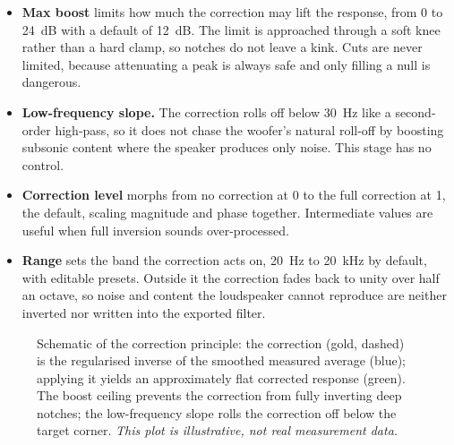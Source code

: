 \begin{itemize}[nosep]
  \item \textbf{Max boost} limits how much the correction may lift the response, from 0 to \SI{24}{\dB} with a default of \SI{12}{\dB}. The limit is approached through a soft knee rather than a hard clamp, so notches do not leave a kink. Cuts are never limited, because attenuating a peak is always safe and only filling a null is dangerous.
  \item \textbf{Low-frequency slope.} The correction rolls off below \SI{30}{\hertz} like a second-order high-pass, so it does not chase the woofer's natural roll-off by boosting subsonic content where the speaker produces only noise. This stage has no control.
  \item \textbf{Correction level} morphs from no correction at 0 to the full correction at 1, the default, scaling magnitude and phase together. Intermediate values are useful when full inversion sounds over-processed.
  \item \textbf{Range} sets the band the correction acts on, \SI{20}{\hertz} to \SI{20}{\kilo\hertz} by default, with editable presets. Outside it the correction fades back to unity over half an octave, so noise and content the loudspeaker cannot reproduce are neither inverted nor written into the exported filter.
\end{itemize}

\begin{figure}[ht]
\centering
{}
\caption{Schematic of the correction principle: the correction (gold, dashed) is the regularised inverse of the smoothed measured average (blue); applying it yields an approximately flat corrected response (green). The boost ceiling prevents the correction from fully inverting deep notches; the low-frequency slope rolls the correction off below the target corner. \emph{This plot is
illustrative, not real measurement data.}}
\label{fig:correction}
\end{figure}

